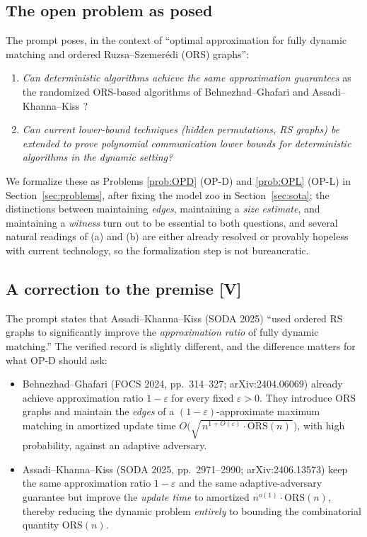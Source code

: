 \documentclass[11pt]{article}
\theoremstyle{definition}
\theoremstyle{remark}
\newcommand{\statusV}{\textcolor{green!45!black}{\textsf{[V]}}}
\newcommand{\ORS}{\mathrm{ORS}}
\newcommand{\eps}{\varepsilon}
\begin{document}
\subsection{The open problem as posed}

The prompt poses, in the context of ``optimal approximation for fully
dynamic matching and ordered Ruzsa--Szemer\'edi (ORS) graphs'':

\begin{enumerate}[label=(\alph*),itemsep=2pt]
\item \emph{Can deterministic algorithms achieve the same approximation
guarantees} as the randomized ORS-based algorithms of Behnezhad--Ghafari
\cite{BG24} and Assadi--Khanna--Kiss \cite{AKK25}?
\item \emph{Can current lower-bound techniques (hidden permutations, RS
graphs) be extended to prove polynomial communication lower bounds for
deterministic algorithms in the dynamic setting?}
\end{enumerate}

We formalize these as Problems \ref{prob:OPD} (OP-D) and \ref{prob:OPL}
(OP-L) in Section~\ref{sec:problems}, after fixing the model zoo in
Section~\ref{sec:sota}; the distinctions between maintaining
\emph{edges}, maintaining a \emph{size estimate}, and maintaining a
\emph{witness} turn out to be essential to both questions, and several
natural readings of (a) and (b) are either already resolved or provably
hopeless with current technology, so the formalization step is not
bureaucratic.

\subsection{A correction to the premise \statusV}
\label{sec:correction}

The prompt states that Assadi--Khanna--Kiss (SODA 2025) ``used ordered RS
graphs to significantly improve the \emph{approximation ratio} of fully
dynamic matching.'' The verified record is slightly different, and the
difference matters for what OP-D should ask:

\begin{itemize}[itemsep=2pt]
\item Behnezhad--Ghafari \cite{BG24} (FOCS 2024, pp.~314--327;
arXiv:2404.06069) already achieve approximation ratio $1-\eps$ for every
fixed $\eps>0$. They introduce $\ORS$ graphs and maintain the
\emph{edges} of a $(1-\eps)$-approximate maximum matching in amortized
update time
$O\!\big(\sqrt{\,n^{1+O(\eps)}\cdot \ORS(n)\,}\big)$,
with high probability, against an adaptive adversary.
\item Assadi--Khanna--Kiss \cite{AKK25} (SODA 2025, pp.~2971--2990;
arXiv:2406.13573) keep the same approximation ratio $1-\eps$ and the same
adaptive-adversary guarantee but improve the \emph{update time} to
amortized $n^{o(1)}\cdot \ORS(n)$, thereby reducing the dynamic problem
\emph{entirely} to bounding the combinatorial quantity $\ORS(n)$.
\end{itemize}
\end{document}
